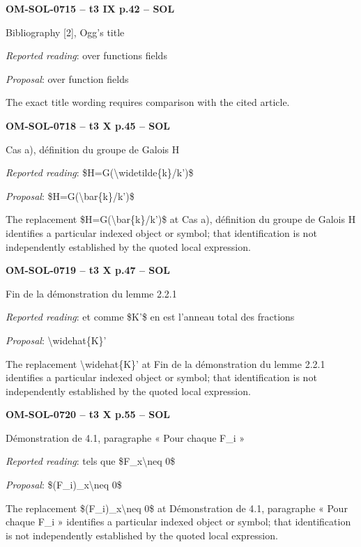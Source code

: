 \par\noindent\textbf{OM-SOL-0715 -- t3 IX p.42 -- SOL}\par
Bibliography [2], Ogg's title\par
\emph{Reported reading}: over functions fields\par
\emph{Proposal}: over function fields\par
The exact title wording requires comparison with the cited article.\par
\par\noindent\textbf{OM-SOL-0718 -- t3 X p.45 -- SOL}\par
Cas a), définition du groupe de Galois H\par
\emph{Reported reading}: \$H=\allowbreak G(\textbackslash{}widetilde\{k\}/k')\$\par
\emph{Proposal}: \$H=\allowbreak G(\textbackslash{}bar\{k\}/k')\$\par
The replacement \$H=\allowbreak G(\textbackslash{}bar\{k\}/k')\$ at Cas a), définition du groupe de Galois H identifies a particular indexed object or symbol; that identification is not independently established by the quoted local expression.\par
\par\noindent\textbf{OM-SOL-0719 -- t3 X p.47 -- SOL}\par
Fin de la démonstration du lemme 2.2.1\par
\emph{Reported reading}: et comme \$K'\$ en est l'anneau total des fractions\par
\emph{Proposal}: \textbackslash{}widehat\{K\}'\par
The replacement \textbackslash{}widehat\{K\}' at Fin de la démonstration du lemme 2.2.1 identifies a particular indexed object or symbol; that identification is not independently established by the quoted local expression.\par
\par\noindent\textbf{OM-SOL-0720 -- t3 X p.55 -- SOL}\par
Démonstration de 4.1, paragraphe « Pour chaque F\_i »\par
\emph{Reported reading}: tels que \$F\_x\textbackslash{}neq 0\$\par
\emph{Proposal}: \$(F\_i)\_x\textbackslash{}neq 0\$\par
The replacement \$(F\_i)\_x\textbackslash{}neq 0\$ at Démonstration de 4.1, paragraphe « Pour chaque F\_i » identifies a particular indexed object or symbol; that identification is not independently established by the quoted local expression.\par

